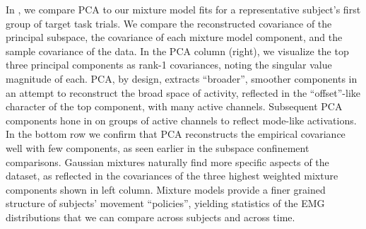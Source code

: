 \documentclass[../main.tex]{subfiles}
\begin{document}


In , we compare PCA to our mixture model fits for a representative subject's first group of target task trials. We compare the reconstructed covariance of the principal subspace, the covariance of each mixture model component, and the sample covariance of the data. In the PCA column (right), we visualize the top three principal components as rank-1 covariances, noting the singular value magnitude of each. PCA, by design, extracts ``broader'', smoother components in an attempt to reconstruct the broad space of activity, reflected in the ``offset''-like character of the top component, with many active channels. Subsequent PCA components hone in on groups of active channels to reflect mode-like activations. In the bottom row we confirm that PCA reconstructs the empirical covariance well with few components, as seen earlier in the subspace confinement comparisons. Gaussian mixtures naturally find more specific aspects of the dataset, as reflected in the covariances of the three highest weighted mixture components shown in left column. Mixture models provide a finer grained structure of subjects' movement ``policies'', yielding statistics of the EMG distributions that we can compare across subjects and across time.

\end{document}

